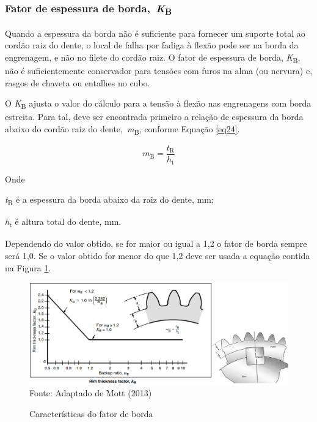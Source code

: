 \documentclass[12pt,a4paper]{article}
\begin{document}
\subsubsection*{\texorpdfstring{Fator de espessura de
borda,~\emph{K}\textsubscript{B}}{Fator de espessura de borda,~KB}}

{\label{fator-de-espessura-de-borda-kb}}

Quando a espessura da borda não é suficiente para fornecer um suporte
total ao cordão raiz do dente, o local de falha por fadiga à flexão pode
ser na borda da engrenagem, e não no filete do cordão raiz. O fator de
espessura de borda, \emph{K}\textsubscript{B}, não é suficientemente
conservador para tensões com furos na alma (ou nervura) e, rasgos de
chaveta ou entalhes no cubo.

O \emph{K}\textsubscript{B} ajusta o valor do cálculo para a tensão à
flexão nas engrenagens com borda estreita. Para tal, deve ser encontrada
primeiro a relação de espessura da borda abaixo do cordão raiz do
dente,~\emph{m}\textsubscript{B}, conforme Equação
{\ref{eq24}}.

\par\null

\begin{equation}
\label{eq24}
m_{\mathrm{B}}\mathrm{=}\frac{t_{\mathrm{R}}}{h_{\mathrm{t}}}
\end{equation}

\par\null

Onde

\emph{t}\textsubscript{R} é a espessura da borda abaixo da raiz do
dente, mm;

\emph{h}\textsubscript{t} é altura total do dente, mm.

Dependendo do valor obtido, se for maior ou igual a 1,2 o fator de borda
sempre será 1,0. Se o valor obtido for menor do que 1,2 deve ser usada a
equação contida na Figura {\ref{fig:24}}.

\begin{figure}[!htb]
    \centering
    \caption{Características do fator de borda}
    \includegraphics[scale=0.9]{Imagens/Img24.png}\\
    {\footnotesize Fonte: Adaptado de Mott (2013)}
    \label{fig:24}
\end{figure}
\end{document}
